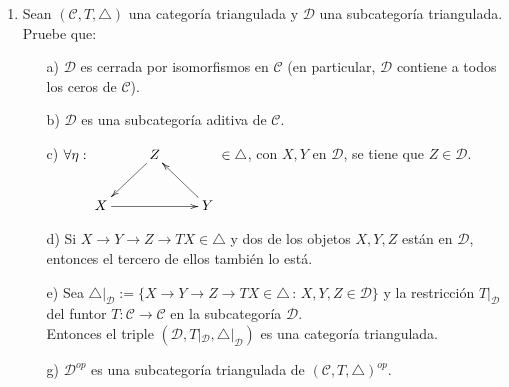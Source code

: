 \documentclass{article}
\begin{document}
\begin{enumerate}[label=\textbf{Ej \arabic*.}]
\begin{proof}
		 Sea $\eta'=\lrprth{X,Y,Z,u,v,W'}$. Como $\eta'\in\Delta$ por $(a)$ se tiene que $\exists !\ \catarrow{g}{Z}{Z}{}$ tal que $\catarrow{\lrprth{1_x,1_Y,g}}{\eta}{\eta'}{i}$ en $\mathscr{T}\lrprth{\mathscr{C},T}$, así que
		\begin{equation*}
			\tmorph{Ap=X,Bp=Y,Cp=Z,fp=u,gp=v,hp=w',II=\text{(A)},III=\text{(B)},}
		\end{equation*}
		es un diagrama conmutativo en $\mathscr{C}$. En partícular, por (A) $g$ es un morfismo tal que $gv=v$. Como $1_Zv=v$ y $\ringmodhom{\mathscr{C}}{X}{T^{-1}Z}=0$, por Ej. 9($b$), entonces $g=1_Z$ y así por (B) se tiene que 
		\begin{align*}
			w&=1_{TX}w=w'g=w'1_Z\\&=w'.
		\end{align*}
		\end{proof}
		\item Sean $(\mathscr{C},T,\triangle)$ una categoría triangulada y $\mathscr{D}$ una subcategoría triangulada. Pruebe que:
		\begin{itemize}
			\item[a)] $\mathscr{D}$ es cerrada por isomorfismos en $\mathscr{C}$ (en particular, $\mathscr{D}$ contiene a todos los ceros de $\mathscr{C}$).
			
			\item[b)] $\mathscr{D}$ es una subcategoría aditiva de  $\mathscr{C}$.
			
			\item[c)] $\forall \eta:\xymatrix{&Z\ar[ld]&\\ X\ar[rr] & &Y\ar[ul]}\in \triangle $, con $X,Y$ en $\mathscr{D}$, se tiene que $Z\in \mathscr{D}$.
			
			\item[d)] Si $X\to Y\to Z\to TX \in \triangle$ y dos de los objetos $X,Y,Z$ están en $\mathscr{D}$, entonces el tercero de ellos también lo está.
			
			\item[e)] Sea $\triangle|_\mathscr{D}:=\{X\to Y\to Z\to TX \in \triangle\,:\, X,Y,Z\in \mathscr{D}\}$ y la
			restricción $T|_\mathscr{D}$ del funtor $T:\mathscr{C}\to\mathscr{C}$ en la subcategoría $\mathscr{D}$.\\
			Entonces el triple $(\mathscr{D},T|_\mathscr{D},\triangle|_\mathscr{D})$ es una categoría triangulada.
			
			\item[g)] $\mathscr{D}^{op}$ es una subcategoría triangulada de $(\mathscr{C},T,\triangle)^{op}$.
		\end{itemize}
		

\end{enumerate}
\end{document}

